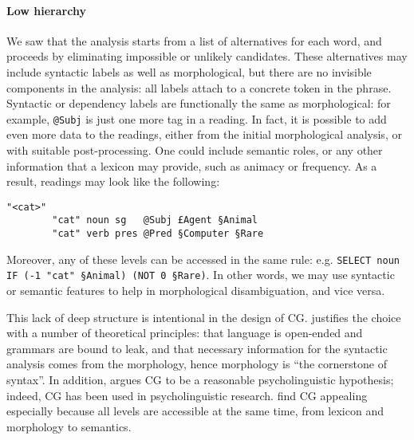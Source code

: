 {\paragraph{Low hierarchy}


We saw that the analysis starts from a list of alternatives for each word, and proceeds by eliminating impossible or unlikely candidates.
These alternatives may include syntactic labels as well as morphological, but there are no invisible components in the analysis: all labels attach to a concrete token in the phrase.
Syntactic or dependency labels are functionally the same as morphological: for example, \texttt{@Subj} is just one more tag in a reading.
In fact, it is possible to add even more data to the readings, either from the initial morphological analysis, or with suitable post-processing. One could include semantic roles, or any other information that a lexicon may provide, such as animacy or frequency.
As a result, readings may look like the following:

\begin{verbatim}
"<cat>"
        "cat" noun sg   @Subj £Agent §Animal
        "cat" verb pres @Pred §Computer §Rare
\end{verbatim}

\noindent Moreover, any of these levels can be accessed in the same rule: e.g. \texttt{SELECT noun IF (-1 "cat" §Animal) (NOT 0 §Rare)}. 
In other words, we may use syntactic or semantic features to help in morphological disambiguation, and vice versa.

This lack of deep structure is intentional in the design of CG.
\cite{karlsson1995constraint} justifies the choice with a number of
theoretical principles: that language is open-ended and grammars are
bound to leak, and that necessary information for the syntactic analysis
comes from the morphology, hence morphology is ``the cornerstone of
syntax''. 
In addition, \cite{karlsson1995constraint} argues CG to be a reasonable 
psycholinguistic hypothesis; indeed, CG has been used in psycholinguistic research.
 find CG appealing especially because all levels are accessible at the same time, from lexicon and morphology to semantics.



}
